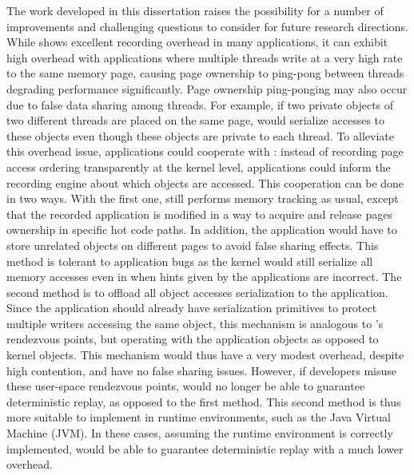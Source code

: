 The work developed in this dissertation raises the possibility for a number of
improvements and challenging questions to consider for future research
directions.
While \scribe shows excellent recording overhead in many applications, it can
exhibit high overhead with applications where multiple threads write at a
very high rate to the same memory page, causing page ownership to ping-pong
between threads degrading performance significantly.
Page ownership ping-ponging may also occur due to false data sharing among
threads. For example, if two private objects of two different threads are placed
on the same page, \scribe would serialize accesses to these objects even though
these objects are private to each thread.
To alleviate this overhead issue, applications could cooperate with \scribe: instead
of recording page access ordering transparently at the kernel level,
applications could inform the recording engine about which objects are accessed.
This cooperation can be done in two ways. With the first one,
\scribe still performs memory tracking as usual, except that the recorded
application is modified in a way to acquire and release pages ownership in
specific hot code paths. In addition, the application would have to store
unrelated objects on different pages to avoid false sharing effects.
This method is tolerant to application bugs as the kernel would still serialize
all memory accesses even in when hints given by the applications are incorrect.
The second method is to offload all object accesses serialization to the application.
Since the application should already have serialization primitives to protect
multiple writers accessing the same object, this mechanism is analogous to
\scribe's rendezvous points, but operating with the application objects as
opposed to kernel objects. This mechanism would thus have a very modest overhead,
despite high contention, and have no false sharing issues.
However, if developers misuse these user-space
rendezvous points, \scribe would no longer be able to guarantee deterministic
replay, as opposed to the first method. This second method is thus more suitable
to implement in runtime environments, such as the Java Virtual Machine (JVM).  In
these cases, assuming the runtime environment is correctly implemented, \scribe
would be able to guarantee deterministic replay with a much lower overhead.

